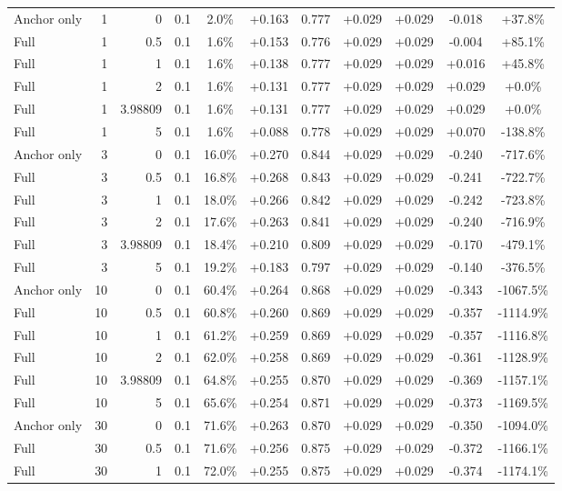 \begin{table}[htbp]
\begin{tabular}{lrrrccccccc}
Anchor only & 1 & 0 & 0.1 & 2.0\% & +0.163 & 0.777 & +0.029 & +0.029 & -0.018 & +37.8\% \\
Full & 1 & 0.5 & 0.1 & 1.6\% & +0.153 & 0.776 & +0.029 & +0.029 & -0.004 & +85.1\% \\
Full & 1 & 1 & 0.1 & 1.6\% & +0.138 & 0.777 & +0.029 & +0.029 & +0.016 & +45.8\% \\
Full & 1 & 2 & 0.1 & 1.6\% & +0.131 & 0.777 & +0.029 & +0.029 & +0.029 & +0.0\% \\
Full & 1 & 3.98809 & 0.1 & 1.6\% & +0.131 & 0.777 & +0.029 & +0.029 & +0.029 & +0.0\% \\
Full & 1 & 5 & 0.1 & 1.6\% & +0.088 & 0.778 & +0.029 & +0.029 & +0.070 & -138.8\% \\
Anchor only & 3 & 0 & 0.1 & 16.0\% & +0.270 & 0.844 & +0.029 & +0.029 & -0.240 & -717.6\% \\
Full & 3 & 0.5 & 0.1 & 16.8\% & +0.268 & 0.843 & +0.029 & +0.029 & -0.241 & -722.7\% \\
Full & 3 & 1 & 0.1 & 18.0\% & +0.266 & 0.842 & +0.029 & +0.029 & -0.242 & -723.8\% \\
Full & 3 & 2 & 0.1 & 17.6\% & +0.263 & 0.841 & +0.029 & +0.029 & -0.240 & -716.9\% \\
Full & 3 & 3.98809 & 0.1 & 18.4\% & +0.210 & 0.809 & +0.029 & +0.029 & -0.170 & -479.1\% \\
Full & 3 & 5 & 0.1 & 19.2\% & +0.183 & 0.797 & +0.029 & +0.029 & -0.140 & -376.5\% \\
Anchor only & 10 & 0 & 0.1 & 60.4\% & +0.264 & 0.868 & +0.029 & +0.029 & -0.343 & -1067.5\% \\
Full & 10 & 0.5 & 0.1 & 60.8\% & +0.260 & 0.869 & +0.029 & +0.029 & -0.357 & -1114.9\% \\
Full & 10 & 1 & 0.1 & 61.2\% & +0.259 & 0.869 & +0.029 & +0.029 & -0.357 & -1116.8\% \\
Full & 10 & 2 & 0.1 & 62.0\% & +0.258 & 0.869 & +0.029 & +0.029 & -0.361 & -1128.9\% \\
Full & 10 & 3.98809 & 0.1 & 64.8\% & +0.255 & 0.870 & +0.029 & +0.029 & -0.369 & -1157.1\% \\
Full & 10 & 5 & 0.1 & 65.6\% & +0.254 & 0.871 & +0.029 & +0.029 & -0.373 & -1169.5\% \\
Anchor only & 30 & 0 & 0.1 & 71.6\% & +0.263 & 0.870 & +0.029 & +0.029 & -0.350 & -1094.0\% \\
Full & 30 & 0.5 & 0.1 & 71.6\% & +0.256 & 0.875 & +0.029 & +0.029 & -0.372 & -1166.1\% \\
Full & 30 & 1 & 0.1 & 72.0\% & +0.255 & 0.875 & +0.029 & +0.029 & -0.374 & -1174.1\% \\

\end{tabular}
\end{table}

